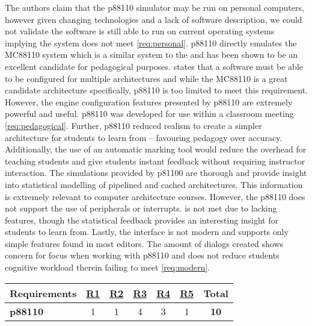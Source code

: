 The authors claim that the p88110 simulator may be run on personal computers, however given changing technologies and a lack of software description, we could not validate the software is still able to run on current operating systems implying the system does not meet \cref{req:personal}. p88110 directly emulates the MC88110 system which is a similar system to the \hcmodel{} and has been shown to be an excellent candidate for pedagogical purposes.  states that a software must be able to be configured for multiple architectures and while the MC88110 is a great candidate architecture specifically, p88110 is too limited to meet this requirement. However, the engine configuration features presented by p88110 are extremely powerful and useful. p88110 was developed for use within a classroom meeting \cref{req:pedagogical}. Further, p88110 reduced realism to create a simpler architecture for students to learn from -- favouring pedagogy over accuracy. Additionally, the use of an automatic marking tool would reduce the overhead for teaching students and give students instant feedback without requiring instructor interaction. The simulations provided by p81100 are thorough and provide insight into statistical modelling of pipelined and cached architectures. This information is extremely relevant to computer architecture courses. However, the p88110 does not support the use of peripherals or interrupts.  is not met due to lacking features, though the statistical feedback provides an interesting insight for students to learn from. Lastly, the interface is not modern and supports only simple features found in most editors. The amount of dialogs created shows concern for focus when working with p88110 and does not reduce students cognitive workload therein failing to meet \cref{req:modern}. 

\begin{table}[h!]
    \centering
    \begin{tabular}{lcccccc}
        \textbf{Requirements} & \textbf{\hyperref[req:personal]{R1}} & \textbf{\hyperref[req:configuration]{R2}} & \textbf{\hyperref[req:pedagogical]{R3}} & \textbf{\hyperref[req:simulations]{R4}} & \textbf{\hyperref[req:modern]{R5}} & \textbf{Total} \\ \hline
        \textbf{p88110 \cite{Garcia2009}}
        & 1 & 1 & 4 & 3 & 1 & \textbf{10} \\
    \end{tabular}
\end{table}

